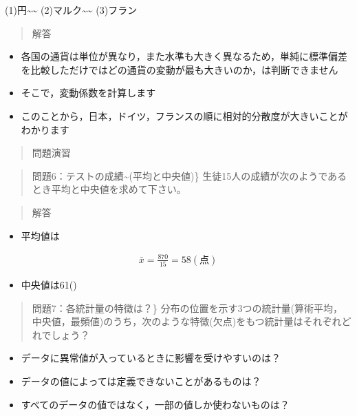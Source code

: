 \documentclass[
]{book}
\providecommand{\tightlist}{%
  \setlength{\itemsep}{0pt}\setlength{\parskip}{0pt}}
\theoremstyle{definition}
\theoremstyle{definition}
\theoremstyle{definition}
\theoremstyle{definition}
\theoremstyle{remark}
\begin{document}
(1)円\textasciitilde\textasciitilde{}
(2)マルク\textasciitilde\textasciitilde{}
(3)フラン

\begin{quote}
解答
\end{quote}

\begin{itemize}
\item
  各国の通貨は単位が異なり，また水準も大きく異なるため，単純に標準偏差を比較しただけではどの通貨の変動が最も大きいのか，は判断できません
\item
  そこで，変動係数を計算します
\end{itemize}

\begin{itemize}
\tightlist
\item
  このことから，日本，ドイツ，フランスの順に相対的分散度が大きいことがわかります
\end{itemize}

\begin{quote}
問題演習
\end{quote}

\begin{quote}
問題6：テストの成績\textasciitilde(平均と中央値)\}
生徒15人の成績が次のようであるとき平均と中央値を求めて下さい。
\end{quote}

\begin{quote}
解答
\end{quote}

\begin{itemize}
\tightlist
\item
  平均値は
\end{itemize}

\begin{align*}
\bar{x}=\frac{870}{15}=58(\text{点})
\end{align*}

\begin{itemize}
\tightlist
\item
  中央値は61()
\end{itemize}

\begin{quote}
問題7：各統計量の特徴は？\}
分布の位置を示す3つの統計量(算術平均，中央値，最頻値)のうち，次のような特徴(欠点)をもつ統計量はそれぞれどれでしょう？
\end{quote}

\begin{itemize}
\tightlist
\item
  データに異常値が入っているときに影響を受けやすいのは？
\item
  データの値によっては定義できないことがあるものは？
\item
  すべてのデータの値ではなく，一部の値しか使わないものは？
\end{itemize}
\end{document}
